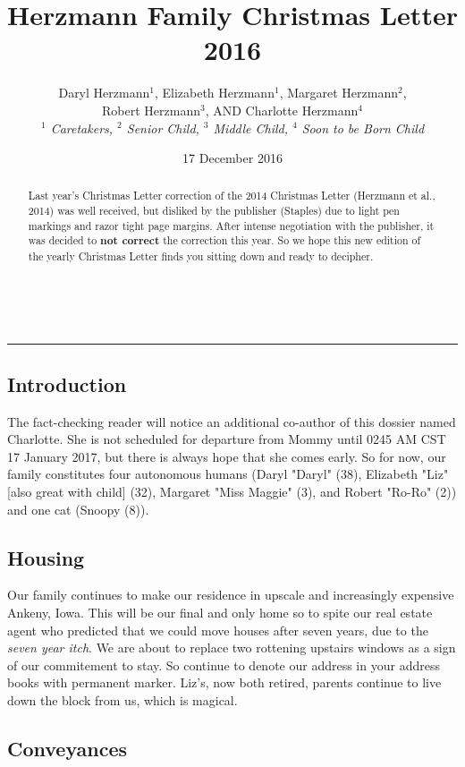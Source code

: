 \documentclass{article}
\title{Herzmann Family Christmas Letter 2016}
\author{Daryl Herzmann${}^1$, Elizabeth Herzmann${}^1$, Margaret 
Herzmann${}^2$,\\
Robert Herzmann${}^3$, AND Charlotte Herzmann${}^4$ \\
\it{${}^1$ Caretakers},
\it{${}^2$ Senior Child},
\it{${}^3$ Middle Child},
\it{${}^4$ Soon to be Born Child}}
\date{17 December 2016}
\newcommand{\Line}[0]{%
  \rule{0cm}{0cm}\\\hrule\rule{0cm}{0cm}%
}
\begin{document}
\maketitle

\begin{abstract}
Last year's Christmas Letter correction of the 2014 Christmas Letter
(Herzmann et al., 2014) was well received, but disliked by the publisher
(Staples) due to light pen markings and razor tight page margins. After intense negotiation with the publisher, it was
decided to \textbf{not correct} the correction this year. So we hope this new
edition of the yearly Christmas Letter finds you sitting down and ready to
decipher.
\end{abstract}

\Line

\begin{multicols}{2}

\section{Introduction} 

The fact-checking reader will notice an additional co-author of this dossier
named Charlotte. She is not scheduled for departure from Mommy until 0245 AM CST 17
January 2017, but there is always hope that she comes early.  So for now, our
family constitutes four autonomous humans (Daryl "Daryl" (38), Elizabeth
"Liz"[also great with child] (32), Margaret "Miss Maggie" (3), and Robert
"Ro-Ro" (2)) and one cat (Snoopy (8)).

\subsection{Housing}

Our family continues to make our residence in upscale and increasingly
expensive Ankeny, Iowa.  This will be our final and only home so to spite our
real estate agent who predicted that we could move houses after seven years, due
to the \textit{seven year itch}.  We are about to replace two rottening upstairs
windows as a sign of our commitement to stay.  So continue to denote our address
in your address books with permanent marker.  Liz's, now both retired, parents
continue to live down the block from us, which is magical.

\subsection{Conveyances}


\end{multicols}
\end{document}
